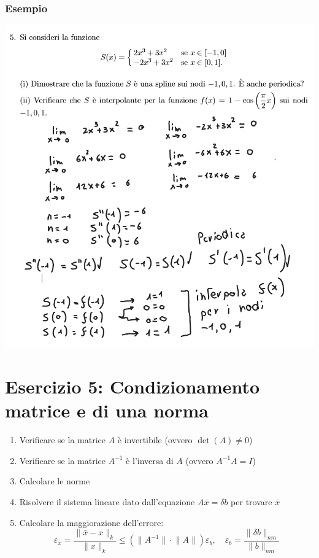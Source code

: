 \documentclass[10pt]{article}
\begin{document}
\subsubsection*{Esempio}
\begin{center}
    \includegraphics[scale=0.6]{spline.png}
\end{center}
\section{Esercizio 5: Condizionamento matrice e di una norma}
\begin{enumerate}
    \item Verificare se la matrice $A$ è invertibile (ovvero $\det(A)\neq 0$)
    \item Verificare se la matrice $A^{-1}$ è l'inversa di $A$ (ovvero $A^{-1}A=I$)
    \item Calcolare le norme
    \item Risolvere il sistema lineare dato dall'equazione $A\bar{x}=\delta b$ per trovare $\bar{x}$
    \item Calcolare la maggiorazione dell'errore: \begin{equation*}
        \varepsilon_{x}=\frac{\lVert \bar{x} -x \rVert_{k}}{\lVert x \rVert_{k}} \leq (\lVert A^{-1}\rVert\cdot\lVert A\rVert)\varepsilon_{b}, \quad \varepsilon_{b}=\frac{\lVert \delta b \rVert_{nm}}{\lVert b \rVert_{nm}}
    \end{equation*}
\end{enumerate}
\end{document}
